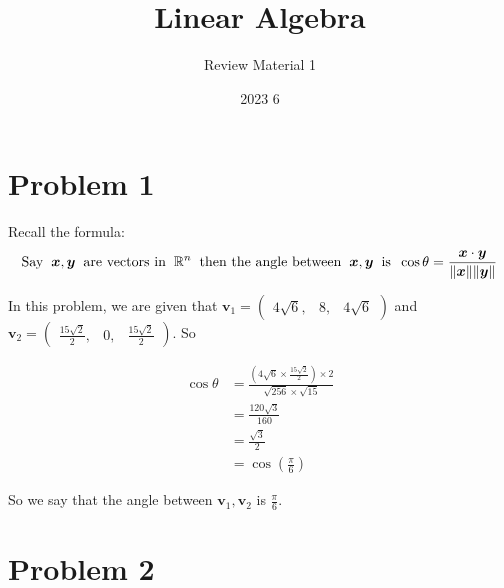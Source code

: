 \documentclass[12pt]{article}
\title{Linear Algebra}
\author{Review Material 1}
\date{2023 6}
\renewcommand{\vec}[1]{\boldsymbol{#1}}
\begin{document}
\doublespacing

\section*{Problem 1}
Recall the formula:
\[ \text{Say} \hspace*{0.2cm} \vec x, \vec y \hspace*{0.2cm} \text{are vectors in}
\hspace*{0.2cm} \mathbb{R}^n \hspace*{0.2cm} \text{then the angle between} \hspace*{0.2cm} \vec x, \vec y
\hspace*{0.2cm}\text{is} \hspace*{0.2cm} \cos{\theta} =
 \frac{\vec x \cdot \vec y}{\Vert \vec x \Vert \Vert \vec y \Vert} \]

In this problem, we are given that $ \vec v_1 = 
\begin{pmatrix}
    4\sqrt{6}, & 8, & 4\sqrt{6}
\end{pmatrix} $ and $\vec v_2 = 
\begin{pmatrix}
    \frac{15\sqrt{2}}{2},& 0 ,&\frac{15\sqrt{2}}{2}
\end{pmatrix} $. So

\begin{align*}
    \cos{\theta} & = \frac{\left(4\sqrt{6}\times\frac{15\sqrt{2}}{2} \right)
    \times 2}{\sqrt{256}\times \sqrt{15}} \\
    & = \frac{120\sqrt{3}}{160} \\
    & = \frac{\sqrt{3}}{2} \\
    & = \cos\left( \frac{\pi}{6} \right) 
\end{align*}

So we say that the angle between $\vec v_1, \vec v_2 $ is $\frac{\pi}{6}$.

\newpage
\section*{Problem 2}
\end{document}

